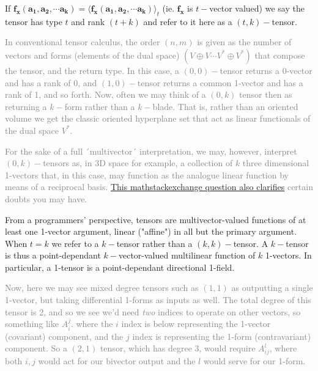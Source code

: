 \documentclass[a4paper]{book}
\numberwithin{equation}{chapter}
\begin{document}
If $ \mathbf{f_x}\mathbf{(a_1, a_2, \cdots a_k)} =
\langle \mathbf{f_x}\mathbf{(a_1, a_2, \cdots a_k)} \rangle_t $
(ie. $\mathbf{f_x}$  is $t-$vector valued)
we say the tensor has type $t$ and rank $(t+k)$ 
and refer to it here as a $(t,k)-$tensor.

\vspace{\baselineskip}

\textcolor{gray}{
In conventional tensor calculus, the order $(n,m)$ is given as the 
number of vectors and forms (elements of the dual space) 
$(V\oplus V \cdots V^* \oplus V^*)$ that compose the tensor, and the return type.
In this case, a $(0,0)-$tensor returns a 0-vector and has a rank of $0$, and
$(1,0)-$tensor returns a common 1-vector and has a rank of 1, and so forth. Now,
often we may think of a $(0,k)$ tensor then as returning a $k-$form rather than a
$k-$blade. That is, rather than an oriented volume we get the classic oriented
hyperplane set that act as linear functionals of the dual space $V^*$.}

\vspace{\baselineskip}

\textcolor{gray}{For the sake of a full ´multivector´ interpretation, we may, however,
interpret $(0,k)-$tensors as, in 3D space for example, a collection of $k$ three dimensional
1-vectors that, in this case, may function as the analogue linear function by means of a reciprocal
basis. \href{https://math.stackexchange.com/questions/3447049/intuitive-understanding-of-2-forms-1-1-tensors-and-other-fundamental-objects}{This mathstackexchange question also clarifies}
certain doubts you may have.}

\vspace{\baselineskip}

From a programmers' perspective, tensors are multivector-valued functions of 
at least one 1-vector argument, linear ("affine") in all but the primary argument.
When $t=k$ we refer to a $k-$tensor rather than a $(k,k)-$tensor.
A $k-$tensor is thus a point-dependant $k-$vector-valued multilinear 
function of $k$ 1-vectors. 
In particular, a 1-tensor is a point-dependant directional 1-field.

\textcolor{gray}{Now, here we may see mixed degree tensors such as $(1,1)$
as outputting a single 1-vector, but taking differential 1-forms as inputs as well.
The total degree of this tensor is 2, and so we see we'd need \emph{two} indices
to operate on other vectors, so something like $A_i^j$. where the $i$ index
is below representing the 1-vector (covariant) component, and the $j$ index is
representing the 1-form (contravariant) component. So a $(2,1)$ tensor, which has
degree 3, would require $A_{ij}^l$, where both $i,j$ would act for our bivector
output and the $l$ would serve for our 1-form.}
\end{document}

